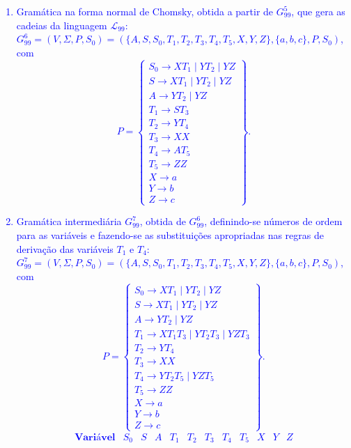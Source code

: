 \documentclass[12pt]{article}
\def\myling{{99}} %
\begin{document}
\textcolor{blue}{
\begin{enumerate}
  \item Gramática na forma normal de Chomsky, obtida a partir de $G_{\myling}^5$,  que gera as cadeias da linguagem $\mathcal{L}_{\myling}$:\\
  $G_{\myling}^6=(V,\Sigma,P,S_0)=(\{A,S,S_0,T_1,T_2,T_3,T_4,T_5,X,Y,Z\},\{a,b,c\},P,S_0)$, com
    $$
     P =
     \left\{\begin{array}{l}
      S_0\to XT_1\mid YT_2\mid YZ\\
      S\to XT_1\mid YT_2\mid YZ\\
      A\to YT_2\mid YZ\\
      T_1\to ST_3\\
      T_2\to YT_4\\
      T_3\to XX\\
      T_4\to AT_5\\
      T_5\to ZZ\\
      X\to a\\
      Y\to b\\
      Z\to c
     \end{array}\right\}.
    $$
  \item Gramática intermediária $G_{\myling}^7$, obtida de $G_{\myling}^6$, definindo-se números de ordem para as variáveis e fazendo-se as substituições apropriadas nas regras de derivação das variáveis $T_1$ e $T_4$:\\
  $G_{\myling}^7=(V,\Sigma,P,S_0)=(\{A,S,S_0,T_1,T_2,T_3,T_4,T_5,X,Y,Z\},\{a,b,c\},P,S_0)$, com
    $$
     P =
     \left\{\begin{array}{l}
      S_0\to XT_1\mid YT_2\mid YZ\\
      S\to XT_1\mid YT_2\mid YZ\\
      A\to YT_2\mid YZ\\
      T_1\to XT_1T_3\mid YT_2T_3\mid YZT_3\\
      T_2\to YT_4\\
      T_3\to XX\\
      T_4\to YT_2T_5\mid YZT_5\\
      T_5\to ZZ\\
      X\to a\\
      Y\to b\\
      Z\to c
     \end{array}\right\}.
    $$
    $$
     \begin{array}{l|ccccccccccc}
      \textbf{Variável} & S_0 & S & A & T_1 & T_2 & T_3 & T_4 & T_5 & X & Y & Z\\

\end{array}$$
\end{enumerate}}
\end{document}
